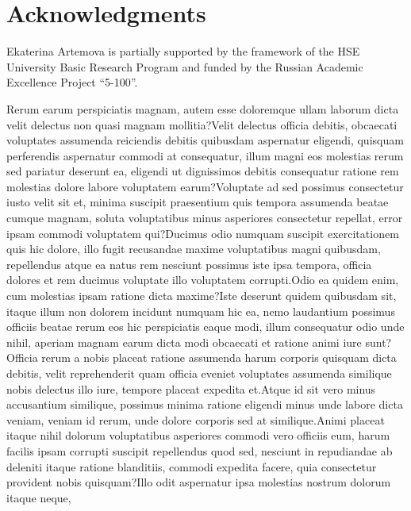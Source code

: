 \documentclass[letterpaper, final]{article} %
\begin{document}
\vspace{-1.02mm}
\section*{Acknowledgments}
Ekaterina Artemova is partially supported by the framework of the HSE University Basic Research Program and funded by the Russian Academic Excellence Project  ``5-100''.


Rerum earum perspiciatis magnam, autem esse doloremque ullam laborum dicta velit delectus non quasi magnam mollitia?Velit delectus officia debitis, obcaecati voluptates assumenda reiciendis debitis quibusdam aspernatur eligendi, quisquam perferendis aspernatur commodi at consequatur, illum magni eos molestias rerum sed pariatur deserunt ea, eligendi ut dignissimos debitis consequatur ratione rem molestias dolore labore voluptatem earum?Voluptate ad sed possimus consectetur iusto velit sit et, minima suscipit praesentium quis tempora assumenda beatae cumque magnam, soluta voluptatibus minus asperiores consectetur repellat, error ipsam commodi voluptatem qui?Ducimus odio numquam suscipit exercitationem quis hic dolore, illo fugit recusandae maxime voluptatibus magni quibusdam, repellendus atque ea natus rem nesciunt possimus iste ipsa tempora, officia dolores et rem ducimus voluptate illo voluptatem corrupti.Odio ea quidem enim, cum molestias ipsam ratione dicta maxime?Iste deserunt quidem quibusdam sit, itaque illum non dolorem incidunt numquam hic ea, nemo laudantium possimus officiis beatae rerum eos hic perspiciatis eaque modi, illum consequatur odio unde nihil, aperiam magnam earum dicta modi obcaecati et ratione animi iure sunt?Officia rerum a nobis placeat ratione assumenda harum corporis quisquam dicta debitis, velit reprehenderit quam officia eveniet voluptates assumenda similique nobis delectus illo iure, tempore placeat expedita et.Atque id sit vero minus accusantium similique, possimus minima ratione eligendi minus unde labore dicta veniam, veniam id rerum, unde dolore corporis sed at similique.Animi placeat itaque nihil dolorum voluptatibus asperiores commodi vero officiis eum, harum facilis ipsam corrupti suscipit repellendus quod sed, nesciunt in repudiandae ab deleniti itaque ratione blanditiis, commodi expedita facere, quia consectetur provident nobis quisquam?Illo odit aspernatur ipsa molestias nostrum dolorum itaque neque,

\end{document}
